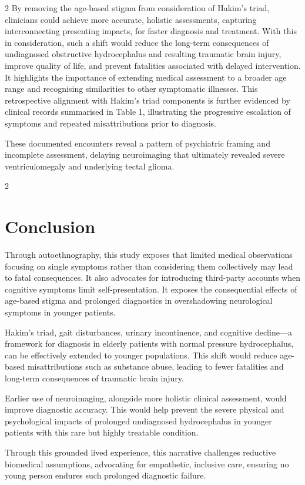 \documentclass{article}
\begin{document}
\begin{multicols}{2}
By removing the age-based stigma from consideration of Hakim’s triad, clinicians could achieve more accurate, holistic assessments, capturing interconnecting presenting impacts, for faster diagnosis and treatment. With this in consideration, such a shift would reduce the long-term consequences of undiagnosed obstructive hydrocephalus and resulting traumatic brain injury, improve quality of life, and prevent fatalities associated with delayed intervention. It highlights the importance of extending medical assessment to a broader age range and recognising similarities to other symptomatic illnesses. This retrospective alignment with Hakim’s triad components is further evidenced by clinical records summarised in Table 1, illustrating the progressive escalation of symptoms and repeated misattributions prior to diagnosis.

\end{multicols}



\noindent
These documented encounters reveal a pattern of psychiatric framing and incomplete assessment, delaying neuroimaging that ultimately revealed severe ventriculomegaly and underlying tectal glioma.

\begin{multicols}{2}
\section*{Conclusion}
Through autoethnography, this study exposes that limited medical observations focusing on single symptoms rather than considering them collectively may lead to fatal consequences. It also advocates for introducing third-party accounts when cognitive symptoms limit self-presentation. It exposes the consequential effects of age-based stigma and prolonged diagnostics in overshadowing neurological symptoms in younger patients.

Hakim’s triad, gait disturbances, urinary incontinence, and cognitive decline---a framework for diagnosis in elderly patients with normal pressure hydrocephalus, can be effectively extended to younger populations. This shift would reduce age-based misattributions such as substance abuse, leading to fewer fatalities and long-term consequences of traumatic brain injury.

Earlier use of neuroimaging, alongside more holistic clinical assessment, would improve diagnostic accuracy. This would help prevent the severe physical and psychological impacts of prolonged undiagnosed hydrocephalus in younger patients with this rare but highly treatable condition.

Through this grounded lived experience, this narrative challenges reductive biomedical assumptions, advocating for empathetic, inclusive care, ensuring no young person endures such prolonged diagnostic failure.



\end{multicols}
\end{document}
